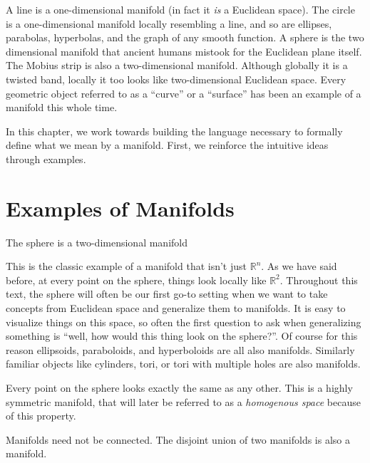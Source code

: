 \documentclass[../master.tex]{subfiles}
\begin{document}
	A line is a one-dimensional manifold (in fact it \emph{is} a Euclidean space).  The circle is a one-dimensional manifold locally resembling a line, and so are ellipses, parabolas, hyperbolas, and the graph of any smooth function. A sphere is the two dimensional manifold that ancient humans mistook for the Euclidean plane itself. The Mobius strip is also a two-dimensional manifold. Although globally it is a twisted band, locally it too looks like two-dimensional Euclidean space. Every geometric object referred to as a ``curve'' or a ``surface'' has been an example of a manifold this whole time. 
	
	In this chapter, we work towards building the language necessary to formally define what we mean by a manifold. First, we reinforce the intuitive ideas through examples.
	
	
	\section{Examples of Manifolds} %
	\label{sec:examples_of_manifolds}
	
	\begin{example}
		The sphere is a two-dimensional manifold
	\end{example}
	
		This is the classic example of a manifold that isn't just $\mathbb R^n$. As we have said before, at every point on the sphere, things look locally like $\mathbb R^2$. Throughout this text, the sphere will often be our first go-to setting when we want to take concepts from Euclidean space and generalize them to manifolds. It is easy to visualize things on this space, so often the first question to ask when generalizing something is ``well, how would this thing look on the sphere?''. Of course for this reason ellipsoids, paraboloids, and hyperboloids are all also manifolds. Similarly familiar objects like cylinders, tori, or tori with multiple holes are also manifolds.
		
		Every point on the sphere looks exactly the same as any other. This is a highly symmetric manifold, that will later be referred to as a \emph{homogenous space} because of this property.
	
	\begin{example}
		Manifolds need not be connected. The disjoint union of two manifolds is also a manifold.
	\end{example}
	
\end{document}
